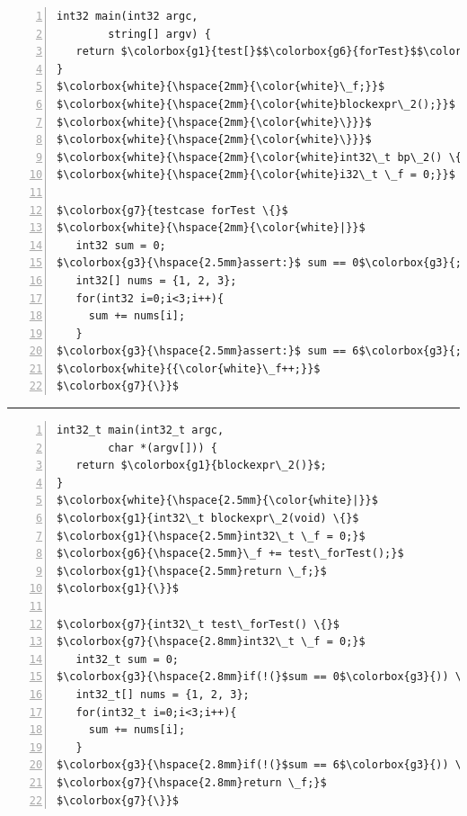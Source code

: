 \vspace{-2mm}
\noindent 
\hspace{1.2mm}
\begin{minipage}[t]{120pt} 
\begin{lstlisting}[language=reducedMbeddr,numbers=left]
int32 main(int32 argc,
		string[] argv) {
   return $\colorbox{g1}{test[}$$\colorbox{g6}{forTest}$$\colorbox{g1}{]}$;
}
$\colorbox{white}{\hspace{2mm}{\color{white}\_f;}}$
$\colorbox{white}{\hspace{2mm}{\color{white}blockexpr\_2();}}$
$\colorbox{white}{\hspace{2mm}{\color{white}\}}}$
$\colorbox{white}{\hspace{2mm}{\color{white}\}}}$
$\colorbox{white}{\hspace{2mm}{\color{white}int32\_t bp\_2() \{}}$ 
$\colorbox{white}{\hspace{2mm}{\color{white}i32\_t \_f = 0;}}$		

$\colorbox{g7}{testcase forTest \{}$ 
$\colorbox{white}{\hspace{2mm}{\color{white}|}}$
   int32 sum = 0;
$\colorbox{g3}{\hspace{2.5mm}assert:}$ sum == 0$\colorbox{g3}{;}$   
   int32[] nums = {1, 2, 3};
   for(int32 i=0;i<3;i++){
     sum += nums[i];
   }
$\colorbox{g3}{\hspace{2.5mm}assert:}$ sum == 6$\colorbox{g3}{;}$
$\colorbox{white}{{\color{white}\_f++;}}$
$\colorbox{g7}{\}}$
\end{lstlisting}
\end{minipage} 
\rule[-52ex]{0.1ex}{23.0em}
\hspace{0.75mm}
\begin{minipage}[t]{125pt} 
\begin{lstlisting}[language=reducedMbeddr,numbers=left]
int32_t main(int32_t argc,
		char *(argv[])) {
   return $\colorbox{g1}{blockexpr\_2()}$;
}  
$\colorbox{white}{\hspace{2.5mm}{\color{white}|}}$
$\colorbox{g1}{int32\_t blockexpr\_2(void) \{}$
$\colorbox{g1}{\hspace{2.5mm}int32\_t \_f = 0;}$
$\colorbox{g6}{\hspace{2.5mm}\_f += test\_forTest();}$
$\colorbox{g1}{\hspace{2.5mm}return \_f;}$
$\colorbox{g1}{\}}$

$\colorbox{g7}{int32\_t test\_forTest() \{}$
$\colorbox{g7}{\hspace{2.8mm}int32\_t \_f = 0;}$
   int32_t sum = 0;
$\colorbox{g3}{\hspace{2.8mm}if(!(}$sum == 0$\colorbox{g3}{)) \{ \_f++; \}}$
   int32_t[] nums = {1, 2, 3};
   for(int32_t i=0;i<3;i++){
     sum += nums[i];
   }
$\colorbox{g3}{\hspace{2.8mm}if(!(}$sum == 6$\colorbox{g3}{)) \{ \_f++; \}}$
$\colorbox{g7}{\hspace{2.8mm}return \_f;}$
$\colorbox{g7}{\}}$
\end{lstlisting}
\end{minipage} 
\vspace{-3mm}
\begin{lstlisting}[caption={Example mbeddr program using the unit test language
on the left and the C code that has been generated from it on the right},
language=mbeddr,label=lst:generatedUT]
\end{lstlisting}


